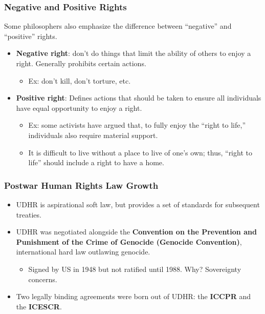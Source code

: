 \documentclass{beamer}
\begin{document}
\begin{frame} 
	\frametitle{\LARGE{Negative and Positive Rights}}
	Some philosophers also emphasize the difference between ``negative” and ``positive” rights. \pause
	\begin{itemize}
		\item \textbf{Negative right}: don't do things that limit the ability of others to enjoy a right. Generally prohibits certain actions.
		\begin{itemize}
			\item Ex: don't kill, don't torture, etc. \pause
		\end{itemize}
		\item \textbf{Positive right}: Defines actions that should be taken to ensure all individuals have equal opportunity to enjoy a right. \pause
		\begin{itemize}
			\item Ex: some activists have argued that, to fully enjoy the “right to life,” individuals also require material support. 
			\item It is difficult to live without a place to live of one’s own; thus, ``right to life” should include a right to have a home. 
		\end{itemize}
	\end{itemize}
\end{frame}

\begin{frame} 
	\frametitle{\LARGE{Postwar Human Rights Law Growth}}
	\begin{itemize}
		\item UDHR is aspirational soft law, but provides a set of standards for subsequent treaties. \pause
		\item UDHR was negotiated alongside the \textbf{Convention on the Prevention and Punishment of the Crime of Genocide (Genocide Convention)}, international hard law outlawing genocide. \pause
		\begin{itemize}
			\item Signed by US in 1948 but not ratified until 1988. Why? \pause Sovereignty concerns. \pause
		\end{itemize}
		\item Two legally binding agreements were born out of UDHR: the \textbf{ICCPR} and the \textbf{ICESCR}.
	\end{itemize}
\end{frame}
\end{document}
